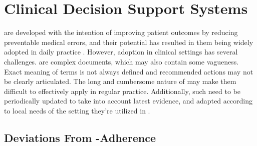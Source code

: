 
\section{Clinical Decision Support Systems}\label{sec:cdss-background}


\BPGs{} are developed with the intention of improving patient outcomes
by reducing preventable medical errors, and their potential
has resulted in them being widely adopted
in daily practice \cite{WoolfBMJ99}. However, \BPG{} adoption in
clinical settings has several challenges. \BPGs{} are complex documents,
which may also contain some vagueness.
Exact meaning of terms is not always defined and recommended
actions may not be clearly articulated. The long and cumbersome
nature of \BPGs{} may make them difficult to effectively apply
in regular practice. Additionally, such \BPGs{} need to be
periodically updated to take into account latest evidence, and
adapted according to local needs of the setting they're utilized
in \cite{DeClerqSHTI08}.

\subsection{Deviations From \BPG{}-Adherence}

